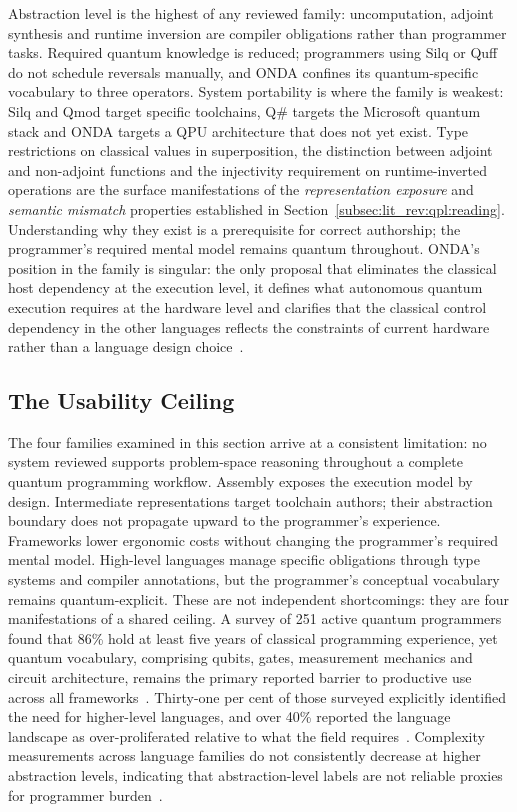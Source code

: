 Abstraction level is the highest of any reviewed family: uncomputation, adjoint synthesis and runtime inversion are compiler obligations rather than programmer tasks.
Required quantum knowledge is reduced; programmers using Silq or Quff do not schedule reversals manually, and ONDA confines its quantum-specific vocabulary to three operators.
System portability is where the family is weakest: Silq and Qmod target specific toolchains, Q\# targets the Microsoft quantum stack and ONDA targets a QPU architecture that does not yet exist.
Type restrictions on classical values in superposition, the distinction between adjoint and non-adjoint functions and the injectivity requirement on runtime-inverted operations are the surface manifestations of the \textit{representation exposure} and \textit{semantic mismatch} properties established in Section~\ref{subsec:lit_rev:qpl:reading}.
Understanding why they exist is a prerequisite for correct authorship; the programmer's required mental model remains quantum throughout.
ONDA's position in the family is singular: the only proposal that eliminates the classical host dependency at the execution level, it defines what autonomous quantum execution requires at the hardware level and clarifies that the classical control dependency in the other languages reflects the constraints of current hardware rather than a language design choice~\cite{degregorio2024onda}.

\subsection{The Usability Ceiling}\label{subsec:lit_rev:qpl:ceiling}
The four families examined in this section arrive at a consistent limitation: no system reviewed supports problem-space reasoning throughout a complete quantum programming workflow.
Assembly exposes the execution model by design.
Intermediate representations target toolchain authors; their abstraction boundary does not propagate upward to the programmer's experience.
Frameworks lower ergonomic costs without changing the programmer's required mental model.
High-level languages manage specific obligations through type systems and compiler annotations, but the programmer's conceptual vocabulary remains quantum-explicit.
These are not independent shortcomings: they are four manifestations of a shared ceiling.
A survey of 251 active quantum programmers found that 86\% hold at least five years of classical programming experience, yet quantum vocabulary, comprising qubits, gates, measurement mechanics and circuit architecture, remains the primary reported barrier to productive use across all frameworks~\cite{ferreira2024qplusage}.
Thirty-one per cent of those surveyed explicitly identified the need for higher-level languages, and over 40\% reported the language landscape as over-proliferated relative to what the field requires~\cite{ferreira2024qplusage}.
Complexity measurements across language families do not consistently decrease at higher abstraction levels, indicating that abstraction-level labels are not reliable proxies for programmer burden~\cite{corralesgarro2025productivityexpressiveness}.

